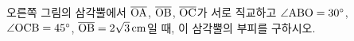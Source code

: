 \noindent\begin{minipage}[t]{0.58\linewidth}\vspace{0pt}\raggedright 오른쪽 그림의 삼각뿔에서 $\overline{\mathrm{OA}}$, $\overline{\mathrm{OB}}$, $\overline{\mathrm{OC}}$가 서로 직교하고 $\angle\mathrm{ABO}=30^\circ$, $\angle\mathrm{OCB}=45^\circ$, $\overline{\mathrm{OB}}=2\sqrt{3}\,\mathrm{cm}$일 때, 이 삼각뿔의 부피를 구하시오.\end{minipage}\hfill\begin{minipage}[t]{0.4\linewidth}\vspace{0pt}\centering \resizebox{\ifdim\width>\linewidth\linewidth\else\width\fi}{!}{}\end{minipage}\par
